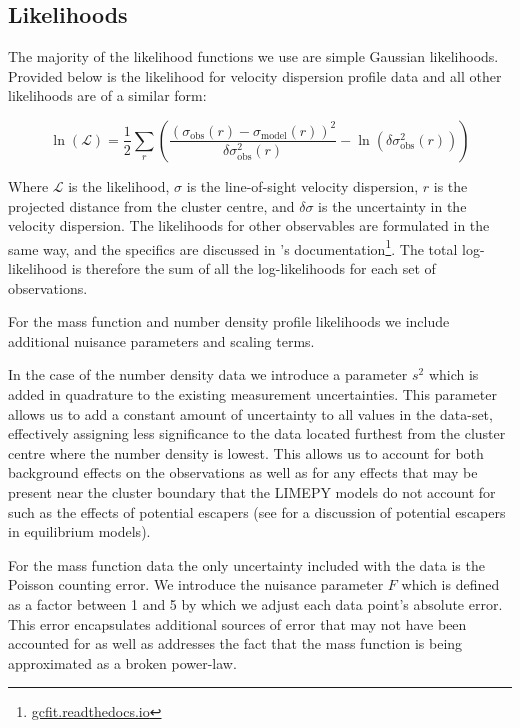 \subsection{Likelihoods}

The majority of the likelihood functions we use are simple Gaussian likelihoods. Provided below is
the likelihood for velocity dispersion profile data and all other likelihoods are of a similar form:

\begin{equation}
    \ln \left(\mathcal{L}\right)=\frac{1}{2}
    \sum_{r}\left(\frac{\left(\sigma_{\mathrm{obs}}(r)
        -\sigma_{\mathrm{model}}(r)\right)^{2}}{\delta \sigma_{\mathrm{obs}}^{2}(r)}
    -\ln \left(\delta \sigma_{\mathrm{obs}}^{2}(r)\right)\right)
\end{equation}

Where $\mathcal{L}$ is the likelihood, $\sigma$ is the line-of-sight velocity dispersion, $r$ is the
projected distance from the cluster centre, and $\delta \sigma$ is the uncertainty in the velocity
dispersion. The likelihoods for other observables are formulated in the same way, and the specifics
are discussed in 's documentation\footnote{\url{gcfit.readthedocs.io}}. The total
log-likelihood is therefore the sum of all the log-likelihoods for each set of observations.

For the mass function and number density profile likelihoods we include additional nuisance
parameters and scaling terms.

In the case of the number density data we introduce a parameter $s^2$ which is added in quadrature
to the existing measurement uncertainties. This parameter allows us to add a constant amount of
uncertainty to all values in the data-set, effectively assigning less significance to the data
located furthest from the cluster centre where the number density is lowest. This allows us to
account for both background effects on the observations as well as for any effects that may be
present near the cluster boundary that the LIMEPY models do not account for such as the effects of
potential escapers (see \citealt{Claydon2019} for a discussion of potential escapers in equilibrium
models).

For the mass function data the only uncertainty included with the data is the Poisson counting
error. We introduce the nuisance parameter $F$ which is defined as a factor between 1 and 5 by which
we adjust each data point's absolute error. This error encapsulates additional sources of error that
may not have been accounted for as well as addresses the fact that the mass function is being
approximated as a broken power-law.


